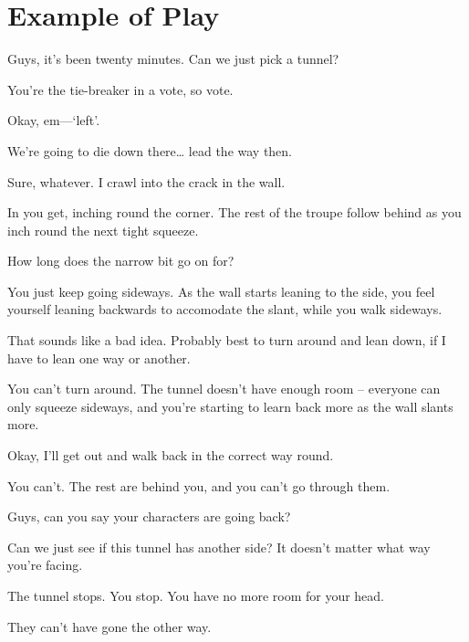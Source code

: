 \section{Example of Play}

\begin{multicols}{2}

\begin{description}\sf
  \item[Player 3:]
  Guys, it's been twenty minutes.
  Can  we just pick a tunnel?
  \item[\Glsentrytext{gm}:]
  You're the tie-breaker in a vote, so vote.
  \item[Player 3:]
  Okay, em---`left'.
  \item[Player 2:]
  We're going to die down there\ldots
  lead the way then.
  \item[Player 3:]
  Sure, whatever.
  I crawl into the crack in the wall.
  \item[\Glsentrytext{gm}:]
  In you get, inching round the corner.
  The rest of the troupe follow behind as you inch round the next tight squeeze.
  \item[Player 3:]
  How long does the narrow bit go on for?
  \item[\Glsentrytext{gm}:]
  You just keep going sideways.
  As the wall starts leaning to the side, you feel yourself leaning backwards to accomodate the slant, while you walk sideways.
  \item[Player 3:]
  That sounds like a bad idea.
  Probably best to turn around and lean down, if I have to lean one way or another.
  \item[\Glsentrytext{gm}:]
  You can't turn around.
  The tunnel doesn't have enough room -- everyone can only squeeze sideways, and you're starting to learn back more as the wall slants more.
  \item[Player 3:]
  Okay, I'll get out and walk back in the correct way round.
  \item[\Glsentrytext{gm}:]
  You can't.
  The rest are behind you, and you can't go through them.
  \item[Player 3:]
  Guys, can you say your characters are going back?
  \item[Player 2:]
  Can we just see if this tunnel has another side?
  It doesn't matter what way you're facing.
  \item[\Glsentrytext{gm}:]
  The tunnel stops.
  You stop.
  You have no more room for your head.
  \item[Player 1:]
  They can't have gone the other way.

\end{description}
\end{multicols}
